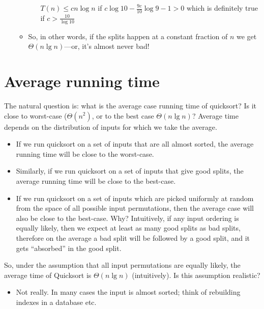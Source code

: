 \documentclass[11pt]{article}
\begin{document}
\begin{itemize}
\begin{itemize}
\begin{itemize}
		  $ T(n) \leq  cn\log n$ if $c\log 10 - \frac{9c}{10} \log 9
		  - 1 > 0 $ which is definitely true if $c>\frac{10}{\log 10}$
		\end{itemize}
		
	      \item So, in other words, if the splits happen at a constant
		fraction of $n$ we get $\Theta(n\lg n)$---or, it's almost
		never bad!
		
	      \end{itemize}
	      \end{itemize}




\section*{Average running time}

The natural question is: what is the average case running time of {\sc
quicksort}? Is it close to worst-case ($\Theta(n^2)$, or to the best
case $\Theta(n\lg n)$?  Average time depends on the distribution of
inputs for which we take the average.
\begin{itemize}
\item If we run {\sc quicksort} on a set of inputs that are all almost
sorted, the average running time will be close to the worst-case.

\item Similarly, if we run {\sc quicksort} on a set of inputs that
give good splits, the average running time will be close to the
best-case.

\item If we run {\sc quicksort} on a set of inputs which are picked
uniformly at random from the space of all possible input permutations,
then the average case will also be close to the best-case.  Why?
Intuitively, if any input ordering is equally likely, then we expect
at least as many good splits as bad splits, therefore on the average a
bad split will be followed by a good split, and it gets ``absorbed''
in the good split.
\end{itemize}

So, under the assumption that all input permutations are equally
likely, the average time of {\sc Quicksort} is $\Theta(n\lg n)$
(intuitively). Is this assumption realistic?

\begin{itemize}
\item Not really. In many cases the input is almost sorted; think of
rebuilding indexes in a database etc.
\end{itemize}
\end{document}
